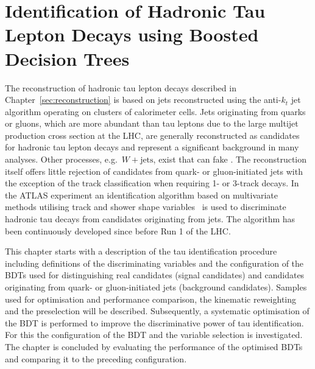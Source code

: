 \chapter{Identification of Hadronic Tau Lepton Decays using Boosted Decision
  Trees}
\label{sec:bdt}
The reconstruction of hadronic tau lepton decays described in
Chapter~\ref{sec:reconstruction} is based on jets reconstructed using the
anti-$k_t$ jet algorithm operating on clusters of calorimeter cells. Jets
originating from quarks or gluons, which are more abundant than tau leptons due
to the large multijet production cross section at the LHC, are generally
reconstructed as candidates for hadronic tau lepton decays and represent a
significant background in many analyses. Other processes, e.g.\
$W{+}\text{jets}$, exist that can fake \tauhadvis. The reconstruction itself
offers little rejection of \tauhadvis candidates from quark- or gluon-initiated
jets with the exception of the track classification when requiring 1- or 3-track
decays. In the ATLAS experiment an identification algorithm based on
multivariate methods utilising track and shower shape
variables~\cite{atlas:taurec:run1, atlas:taurec:run2} is used to discriminate
hadronic tau decays from \tauhadvis candidates originating from jets. The
algorithm has been continuously developed since before Run 1 of the LHC.

This chapter starts with a description of the tau identification procedure
including definitions of the discriminating variables and the configuration of
the BDTs used for distinguishing real \tauhadvis candidates (signal candidates)
and \tauhadvis candidates originating from quark- or gluon-initiated jets
(background candidates). Samples used for optimisation and performance
comparison, the kinematic reweighting and the preselection will be described.
Subsequently, a systematic optimisation of the BDT is performed to improve the
discriminative power of tau identification. For this the configuration of the
BDT and the variable selection is investigated. The chapter is concluded by
evaluating the performance of the optimised BDTs and comparing it to the
preceding configuration.

